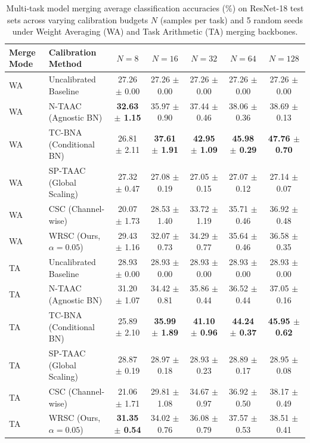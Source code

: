 \documentclass{article}
\theoremstyle{plain}
\theoremstyle{definition}
\theoremstyle{remark}
\begin{document}
\begin{table}[t]
\caption{Multi-task model merging average classification accuracies (\%) on ResNet-18 test sets across varying calibration budgets $N$ (samples per task) and 5 random seeds under Weight Averaging (WA) and Task Arithmetic (TA) merging backbones.}
\label{tab:main_results}
\vskip 0.15in
\begin{center}
\begin{footnotesize}
\begin{sc}
\setlength{\tabcolsep}{4.5pt}
\begin{tabular}{llccccc}
\toprule
Merge Mode & Calibration Method & $N=8$ & $N=16$ & $N=32$ & $N=64$ & $N=128$ \\
\midrule
WA & Uncalibrated Baseline & 27.26 $\pm$ 0.00 & 27.26 $\pm$ 0.00 & 27.26 $\pm$ 0.00 & 27.26 $\pm$ 0.00 & 27.26 $\pm$ 0.00 \\
WA & N-TAAC (Agnostic BN) & \textbf{32.63 $\pm$ 1.15} & 35.97 $\pm$ 0.90 & 37.44 $\pm$ 0.46 & 38.06 $\pm$ 0.36 & 38.69 $\pm$ 0.13 \\
WA & TC-BNA (Conditional BN) & 26.81 $\pm$ 2.11 & \textbf{37.61 $\pm$ 1.91} & \textbf{42.95 $\pm$ 1.09} & \textbf{45.98 $\pm$ 0.29} & \textbf{47.76 $\pm$ 0.70} \\
WA & SP-TAAC (Global Scaling) & 27.32 $\pm$ 0.47 & 27.08 $\pm$ 0.19 & 27.05 $\pm$ 0.15 & 27.07 $\pm$ 0.12 & 27.14 $\pm$ 0.07 \\
WA & CSC (Channel-wise) & 20.07 $\pm$ 1.73 & 28.53 $\pm$ 1.40 & 33.72 $\pm$ 1.19 & 35.71 $\pm$ 0.46 & 36.92 $\pm$ 0.48 \\
WA & WRSC (Ours, $\alpha=0.05$) & 29.43 $\pm$ 1.16 & 32.07 $\pm$ 0.73 & 34.29 $\pm$ 0.77 & 35.64 $\pm$ 0.46 & 36.58 $\pm$ 0.35 \\
\midrule
TA & Uncalibrated Baseline & 28.93 $\pm$ 0.00 & 28.93 $\pm$ 0.00 & 28.93 $\pm$ 0.00 & 28.93 $\pm$ 0.00 & 28.93 $\pm$ 0.00 \\
TA & N-TAAC (Agnostic BN) & 31.20 $\pm$ 1.07 & 34.42 $\pm$ 0.81 & 35.86 $\pm$ 0.44 & 36.52 $\pm$ 0.44 & 37.05 $\pm$ 0.16 \\
TA & TC-BNA (Conditional BN) & 25.89 $\pm$ 2.10 & \textbf{35.99 $\pm$ 1.89} & \textbf{41.10 $\pm$ 0.96} & \textbf{44.24 $\pm$ 0.37} & \textbf{45.95 $\pm$ 0.62} \\
TA & SP-TAAC (Global Scaling) & 28.87 $\pm$ 0.19 & 28.97 $\pm$ 0.18 & 28.93 $\pm$ 0.23 & 28.89 $\pm$ 0.17 & 28.95 $\pm$ 0.08 \\
TA & CSC (Channel-wise) & 21.06 $\pm$ 1.71 & 29.81 $\pm$ 1.08 & 34.67 $\pm$ 0.97 & 36.92 $\pm$ 0.50 & 38.17 $\pm$ 0.49 \\
TA & WRSC (Ours, $\alpha=0.05$) & \textbf{31.35 $\pm$ 0.54} & 34.02 $\pm$ 0.76 & 36.08 $\pm$ 0.79 & 37.57 $\pm$ 0.53 & 38.51 $\pm$ 0.41 \\
\bottomrule
\end{tabular}
\end{sc}
\end{footnotesize}
\end{center}
\vskip -0.1in
\end{table}
\end{document}

